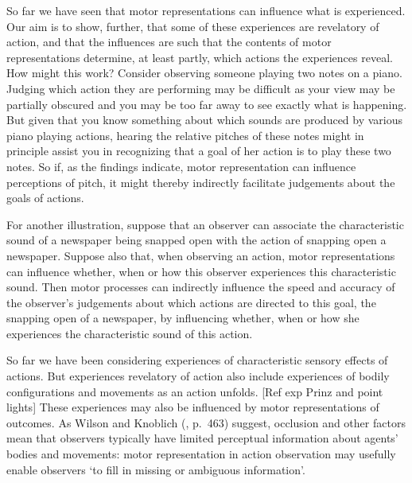 \documentclass[12pt,\papersize]{extarticle}
\begin{document}
So far we have seen that motor representations can influence what is experienced.  Our aim is to show, further, that some of these experiences are revelatory of action, and that the influences are such that the contents of motor representations determine, at least partly, which actions the experiences reveal. How might this work?  Consider observing someone playing two notes on a piano.  Judging which action they are performing may be difficult as your view may be partially obscured and you may be too far away to see exactly what is happening.  But given that you know something about which sounds are produced by various piano playing actions, hearing the relative pitches of these notes might in principle assist you in recognizing that a goal of her action is to play these two notes.  So if, as the findings indicate, motor representation can influence perceptions of pitch, it might thereby indirectly facilitate judgements about the goals of actions.  

For another illustration, suppose that an observer can associate the characteristic sound of a newspaper being snapped open with the action of snapping open a newspaper. Suppose also that, when observing an action, motor  representations can influence whether, when or how this observer experiences this characteristic sound.  Then motor processes can indirectly influence the speed and accuracy of the observer's judgements about which actions are directed to this goal, the snapping open of a newspaper, by influencing whether, when or how she experiences the characteristic sound of this action.

So far we have been considering experiences of characteristic sensory effects of actions. But experiences revelatory of action also include experiences of bodily configurations and movements as an action unfolds. [Ref exp Prinz and point lights]  These experiences may also be influenced by motor representations of outcomes.  As Wilson and Knoblich (\citeyear{Wilson:2005qu}, p.\ 463) suggest, occlusion and other factors mean that observers typically have limited perceptual information about agents' bodies and movements: motor representation in action observation may usefully enable observers `to fill in missing or ambiguous information'. 
\end{document}
